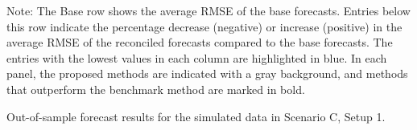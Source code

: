 \documentclass[
  11pt]{article}
\begin{document}
\begin{table}
{\begin{threeparttable}
\begin{tablenotes}[para]
\item Note: The Base row shows the average RMSE of the base forecasts. Entries below this row indicate the percentage decrease (negative) or increase (positive) in the average RMSE of the reconciled forecasts compared to the base forecasts. The entries with the lowest values in each column are highlighted in blue. In each panel, the proposed methods are indicated with a gray background, and methods that outperform the benchmark method are marked in bold.
\end{tablenotes}
\end{threeparttable}}
\end{table}

\hypertarget{tbl-s3-rmse}{}
\begin{table}
\caption{\label{tbl-s3-rmse}Out-of-sample forecast results for the simulated data in Scenario C,
Setup 1. }\tabularnewline


\end{table}
\end{document}
